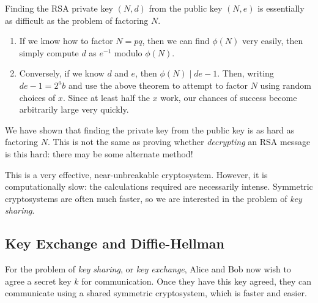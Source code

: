 \documentclass{article}
\begin{document}
\begin{corollary}
    Finding the RSA private key $(N, d)$ from the public key $(N, e)$ is essentially as difficult as the problem of factoring $N$.
    \begin{enumerate}
	    \item If we know how to factor $N = pq$, then we can find $\phi(N)$ very easily, then simply compute $d$ as $e^{-1}$ modulo $\phi(N)$.
	    \item Conversely, if we know $d$ and $e$, then $\phi(N) \mid de-1$. Then, writing $de-1 = 2^ab$ and use the above theorem to attempt to factor $N$ using random choices of $x$. Since at least half the $x$ work, our chances of success become arbitrarily large very quickly.
	\end{enumerate}
\end{corollary}

\begin{note}
	We have shown that finding the private key from the public key is as hard as factoring $N$. This is not the same as proving whether \textit{decrypting} an RSA message is this hard: there may be some alternate method!
\end{note}

This is a very effective, near-unbreakable cryptosystem. However, it is computationally slow: the calculations required are necessarily intense. Symmetric cryptosystems are often much faster, so we are interested in the problem of \textit{key sharing}.


\subsection{Key Exchange and Diffie-Hellman}
\label{section-cryptography-key-exchange}

For the problem of \textit{key sharing}, or \textit{key exchange}, Alice and Bob now wish to agree a secret key $k$ for communication. Once they have this key agreed, they can communicate using a shared symmetric cryptosystem, which is faster and easier.
\end{document}
